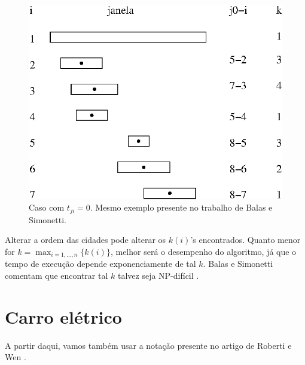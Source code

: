 \documentclass{article}
\begin{document}
\begin{figure}[ht]
  \centering
  \includegraphics[scale=.7]{fig2.eps}
  \caption{Caso com $t_{ji} = 0$. Mesmo exemplo presente no trabalho de Balas e Simonetti.}
  \label{fig1}
\end{figure}

Alterar a ordem das cidades pode alterar os $k(i)$'s encontrados. Quanto menor for $k= \max_{i=1, \dots, n}\{k(i)\}$, melhor será o desempenho do algoritmo, já que o tempo de execução depende exponenciamente de tal $k$. Balas e Simonetti comentam que encontrar tal $k$ talvez seja NP-difícil \cite{BS}.

\section*{Carro elétrico}
A partir daqui, vamos também usar a notação presente no artigo de Roberti e Wen \cite{RW}.

\medskip
\printbibliography
\end{document}
